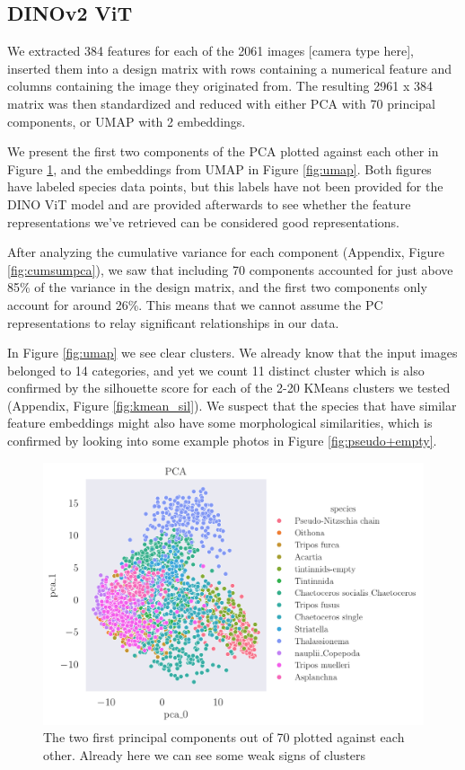 %
%
\subsection{DINOv2 ViT}
We extracted 384 features for each of the 2061 images [camera type here], inserted them into a design matrix with rows containing a numerical feature and columns containing the image they originated from. The resulting 2961 x 384 matrix was then standardized and reduced with either PCA with 70 principal components, or UMAP with 2 embeddings. 

We present the first two components of the PCA plotted against each other in Figure \ref{fig:pca0pca1}, and the embeddings from UMAP in Figure \ref{fig:umap}. Both figures have labeled species data points, but this labels have not been provided for the DINO ViT model and are provided afterwards to see whether the feature representations we've retrieved can be considered good representations.

After analyzing the cumulative variance for each component (Appendix, Figure \ref{fig:cumsumpca}), we saw that including 70 components accounted for just above 85\% of the variance in the design matrix, and the first two components only account for around 26\%. This means that we cannot assume the PC representations to relay significant relationships in our data. 

In Figure \ref{fig:umap} we see clear clusters. We already know that the input images belonged to 14 categories, and yet we count 11 distinct cluster which is also confirmed by the silhouette score for each of the 2-20 KMeans clusters we tested (Appendix, Figure \ref{fig:kmean_sil}). We suspect that the species that have similar feature embeddings might also have some morphological similarities, which is confirmed by looking into some example photos in Figure \ref{fig:pseudo+empty}. 

\begin{figure}[H]
    \centering
    \includegraphics[width=1.1\linewidth]{examples/tests_eb/figs/pca0_pca1.pdf}
    \caption{The two first principal components out of 70 plotted against each other. Already here we can see some weak signs of clusters}
    \label{fig:pca0pca1}
\end{figure}

